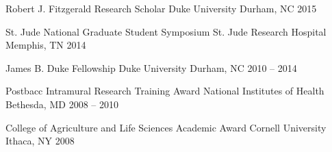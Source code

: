 

\begin{cvhonors}


  \cvhonor
    {Robert J. Fitzgerald Research Scholar} %
    {Duke University} %
    {Durham, NC} %
    {2015} %


  \cvhonor
    {St. Jude National Graduate Student Symposium} %
    {St. Jude Research Hospital} %
    {Memphis, TN} %
    {2014} %


  \cvhonor
    {James B. Duke Fellowship} %
    {Duke University} %
    {Durham, NC} %
    {2010 -- 2014} %


  \cvhonor
    {Postbacc Intramural Research Training Award} %
    {National Institutes of Health} %
    {Bethesda, MD} %
    {2008 -- 2010} %

  \cvhonor
    {College of Agriculture and Life Sciences Academic Award}
    {Cornell University} %
    {Ithaca, NY} %
    {2008} %



\end{cvhonors}
